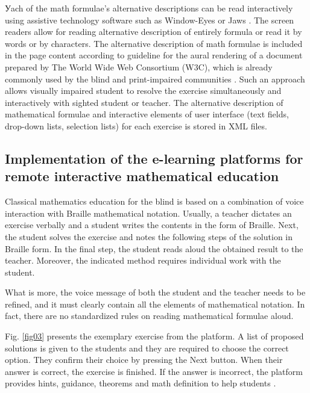 \documentclass[12pt,1p]{elsarticle}
\begin{document}
	Уach of the math formulae's alternative descriptions can be read interactively using assistive technology software such as Window-Eyes or Jaws \cite{window-eyes, job_access}. The screen readers allow for reading alternative description of entirely formula or read it by words or by characters. The alternative description of math formulae is included in the page content according to guideline for the aural rendering of a document prepared by The World Wide Web Consortium (W3C), which is already commonly used by the blind and print-impaired communities \cite{guideline}. Such an approach allows visually impaired student to resolve the exercise simultaneously and interactively with sighted student or teacher. The alternative description of mathematical formulae and interactive elements of user interface (text fields, drop-down lists, selection lists) for each exercise is stored in XML files.

\subsection{Implementation of the e-learning platforms for remote interactive mathematical education}
	Classical mathematics education for the blind is based on a combination of voice interaction with Braille mathematical notation. Usually, a teacher dictates an exercise verbally and a student writes the contents in the form of Braille. Next, the student solves the exercise and notes the following steps of the solution in Braille form. In the final step, the student reads aloud the obtained result to the teacher. Moreover, the indicated method requires individual work with the student.
	
	What is more, the voice message of both the student and the teacher needs to be refined, and it must clearly contain all the elements of mathematical notation. In fact, there are no standardized rules on reading mathematical formulae aloud.

	Fig. \ref{fig03} presents the exemplary exercise from the platform. A list of proposed solutions is given to the students and they are required to choose the correct option. They confirm their choice by pressing the Next button. When their answer is correct, the exercise is finished. If the answer is incorrect, the platform provides hints, guidance, theorems and math definition to help students \cite{Namahoe:2017}.
	
\end{document}
